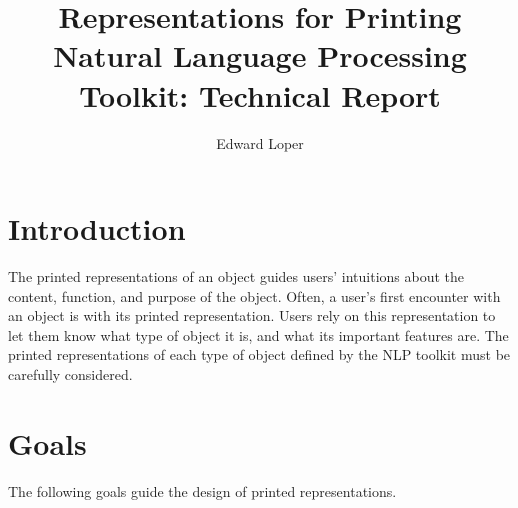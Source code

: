 \documentclass[11pt]{article}
\begin{document}
\title{Representations for Printing\\
\Large Natural Language Processing Toolkit: Technical Report}
\author{Edward Loper}
\maketitle


\section{Introduction}

  The printed representations of an object guides users' intuitions
  about the content, function, and purpose of the object.  Often, a
  user's first encounter with an object is with its printed
  representation.  Users rely on this representation to let them know
  what type of object it is, and what its important features are.  The
  printed representations of each type of object defined by the NLP
  toolkit must be carefully considered.

\section{Goals}

  The following goals guide the design of printed representations.
\end{document}

